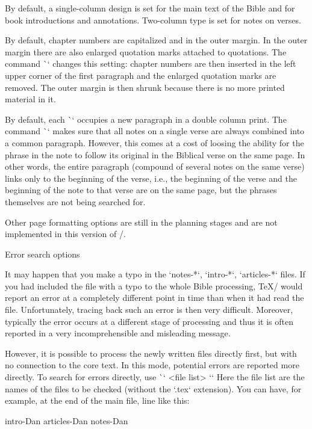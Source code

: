 {{By default, a single-column design is set for the main text of the Bible
and for book introductions and annotations. Two-column type is set for
notes on verses.

By default, chapter numbers are capitalized and in the outer margin. 
In the outer margin there are also enlarged quotation marks attached to quotations. 
The command \`\normalchapnumbers` changes this setting: chapter numbers are then inserted in the left
upper corner of the first paragraph and the enlarged quotation marks are removed.
The outer margin is then shrunk because there is no more printed material in it.  



By default, each \`\Note` occupies a new paragraph in a  double column print. 
The command \`\mergednotes` makes sure that all notes on a single verse are always 
combined into a common paragraph. 
However, this comes at a cost of loosing the ability for the phrase in the note
to follow its original in the Biblical verse on the same page.
In other words, the entire paragraph (compound of several notes on the same verse)
links only  to the beginning of the verse, i.e., the beginning of the verse 
and the beginning of the note to that verse are on the same page,
but the phrases themselves are not being searched for.

Other page formatting options are still in the planning stages and are not implemented in this version of \OpBible/.


\sec Error search options

It may happen that you make a typo in the `notes-*`, `intro-*`,
`articles-*` files. If you had included the file with a typo to the whole Bible processing,
\TeX/ would report an error at a completely different point in time than when it had read the file. 
Unfortunately, tracing back such an error is then very difficult. Moreover, typically the error
occurs at a different stage of processing and thus it is often reported in a very
incomprehensible and misleading message.

However, it is possible to process the newly written files directly first, 
but with no connection to the core text. 
In this mode, potential errors are reported more directly.
To search for errors directly, use \`\checksyntax` <file list> `{}`
Here the file list are the names of the files to be checked (without the `.tex` extension).
You can have, for example, at the end of the main file, line like this:

\begtt
\checksyntax intro-Dan articles-Dan notes-Dan {}
\endtt

}}
